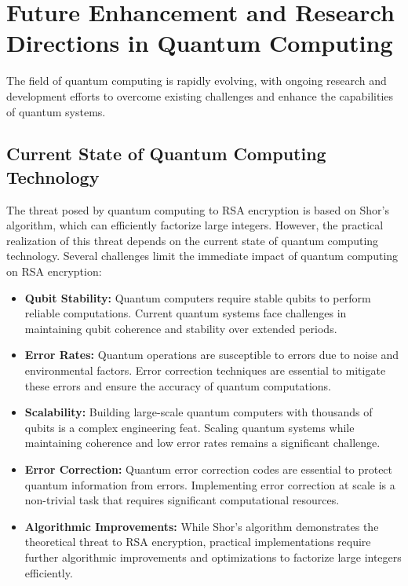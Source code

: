 \documentclass[12pt,a4paper]{report}
\begin{document}
\chapter{Future Enhancement and Research Directions in Quantum Computing}
The field of quantum computing is rapidly evolving, with ongoing research and development efforts to overcome existing challenges and enhance the capabilities of quantum systems. 

\section{Current State of Quantum Computing Technology}
\label{sec:challenge_quantum_computing}
The threat posed by quantum computing to RSA encryption is based on Shor's algorithm, which can efficiently factorize large integers. However, the practical realization of this threat depends on the current state of quantum computing technology. Several challenges limit the immediate impact of quantum computing on RSA encryption:

\begin{itemize}
    \item \textbf{Qubit Stability:} Quantum computers require stable qubits to perform reliable computations. Current quantum systems face challenges in maintaining qubit coherence and stability over extended periods.
    \item \textbf{Error Rates:} Quantum operations are susceptible to errors due to noise and environmental factors. Error correction techniques are essential to mitigate these errors and ensure the accuracy of quantum computations.
    \item \textbf{Scalability:} Building large-scale quantum computers with thousands of qubits is a complex engineering feat. Scaling quantum systems while maintaining coherence and low error rates remains a significant challenge.
    \item \textbf{Error Correction:} Quantum error correction codes are essential to protect quantum information from errors. Implementing error correction at scale is a non-trivial task that requires significant computational resources.
    \item \textbf{Algorithmic Improvements:} While Shor's algorithm demonstrates the theoretical threat to RSA encryption, practical implementations require further algorithmic improvements and optimizations to factorize large integers efficiently.
\end{itemize}
\end{document}
